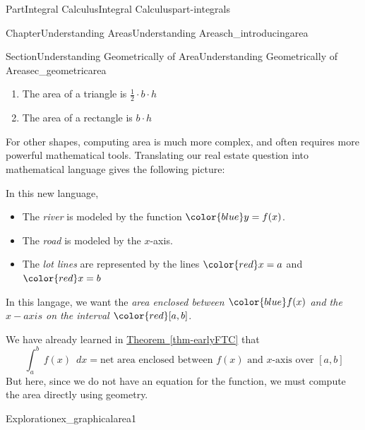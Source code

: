 \documentclass[oneside,10pt,]{tufte-book}
\newcommand{\xreffont}{\relax}
\numberwithin{equation}{chapter}
\newcommand{\red}[1]{   {\color{red}   #1}   }
\newcommand{\blue}[1]{  {\color{blue}  #1}  }
\newcommand{\intdx}[1]{{\,\int#1\,\,dx}}
\begin{document}
\begin{partptx}{Part}{Integral Calculus}{}{Integral Calculus}{}{}{part-integrals}
\begin{chapterptx}{Chapter}{Understanding Areas}{}{Understanding Areas}{}{}{ch_introducingarea}
\begin{sectionptx}{Section}{Understanding Geometrically of Area}{}{Understanding Geometrically of Area}{}{}{sec_geometricarea}
\begin{enumerate}
\item{}The area of a triangle is \(\frac{1}{2}\cdot b\cdot h\)%
\item{}The area of a rectangle is \(b\cdot h\)%
\end{enumerate}
For other shapes, computing area is much more complex, and often requires more powerful mathematical tools. Translating our real estate question into mathematical language gives the following picture:%
\begin{image}{0.25}{0.5}{0.25}{}%
%
\end{image}%
In this new language,%
\begin{itemize}[label=\textbullet]
\item{}The \emph{river} is modeled by the function \(\blue{y=f(x)}\).%
\item{}The \emph{road} is modeled by the \(x\)-axis.%
\item{}The \emph{lot lines} are represented by the lines \(\red{x=a}\) and \(\red{x=b}\)%
\end{itemize}
In this langage, we want the \emph{area enclosed between \(\blue{f(x)}\) and the \(x-axis\) on the interval \(\red{[a,b]}\)}.%
\par
We have already learned in \hyperref[thm-earlyFTC]{Theorem~{\xreffont\ref{thm-earlyFTC}}} that%
\begin{equation*}
\intdx{_a^b \, f(x) \, } = \text{net area enclosed between } f(x) \text{ and } x\text{-axis over }[a,b]
\end{equation*}
But here, since we do not have an equation for the function, we must compute the area directly using geometry.%
\begin{exploration}{Exploration}{}{ex_graphicalarea1}%

\end{exploration}
\end{sectionptx}
\end{chapterptx}
\end{partptx}
\end{document}

